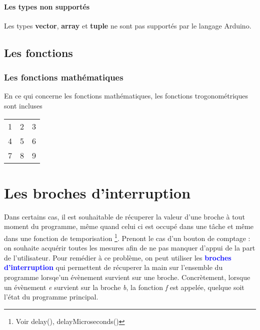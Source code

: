 \documentclass[12pt]{report}
\begin{document}
\subsubsection {Les types non supportés}

Les types \textbf{vector}, \textbf{array} et \textbf{tuple} ne sont pas supportés par le langage Arduino.




\section {Les fonctions}

\subsection{Les fonctions mathématiques}

En ce qui concerne les fonctions mathématiques, les fonctions trogonométriques sont incluses 


\begin{tabular}{ l c r }
   1 & 2 & 3 \\
   4 & 5 & 6 \\
   7 & 8 & 9 \\
 \end{tabular}




\chapter {Les broches d'interruption}

Dans certains cas, il est souhaitable de récuperer la valeur d'une broche à tout moment du programme, même quand celui ci est occupé dans une tâche et même dans une fonction de temporisation \footnote{Voir delay(), delayMicroseconds()}. \newline
Prenont le cas d'un bouton de comptage : on souhaite acquérir toutes les mesures afin de ne pas manquer d'appui de la part de l'utilisateur.\newline
Pour remédier à ce problème, on peut utiliser les \textcolor{blue} {\textbf{broches d'interruption}} qui permettent de récuperer la main sur l'ensemble du programme lorsqe'un évènement survient sur une broche.\newline
Concrètement, lorsque un évènement  \emph{e} survient sur la broche \emph{b}, la fonction \emph{f} est appelée, quelque soit l'état du programme principal. \newline
\end{document}
